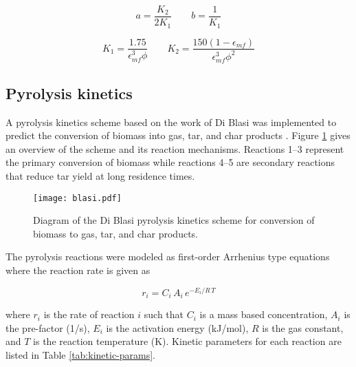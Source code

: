 \begin{equation}
    a = \frac{K_2}{2 K_1} \qquad
    b = \frac{1}{K_1}
\end{equation}

\begin{equation}
    K_1 = \frac{1.75}{\epsilon_{mf}^3 \phi} \qquad
    K_2 = \frac{150(1-\epsilon_{mf})}{\epsilon_{mf}^3 \phi^2}
\end{equation}

\subsection{Pyrolysis kinetics}

A pyrolysis kinetics scheme based on the work of Di Blasi was implemented to predict the conversion of biomass into gas, tar, and char products \cite{Blasi-1993,Blasi-2001}. Figure \ref{fig:blasi} gives an overview of the scheme and its reaction mechanisms. Reactions 1--3 represent the primary conversion of biomass while reactions 4--5 are secondary reactions that reduce tar yield at long residence times.

\begin{figure}[H]
    \centering
    \texttt{[image: blasi.pdf]}
    \caption{Diagram of the Di Blasi pyrolysis kinetics scheme for conversion of biomass to gas, tar, and char products.}
    \label{fig:blasi}
\end{figure}

The pyrolysis reactions were modeled as first-order Arrhenius type equations where the reaction rate is given as

\begin{equation}
    r_i = C_i\,A_i\,e^{-E_i / R\,T}
\end{equation}

\noindent where $r_i$ is the rate of reaction $i$ such that $C_i$ is a mass based concentration, $A_i$ is the pre-factor (1/s), $E_i$ is the activation energy (kJ/mol), $R$ is the gas constant, and $T$ is the reaction temperature (K). Kinetic parameters for each reaction are listed in Table \ref{tab:kinetic-params}.

